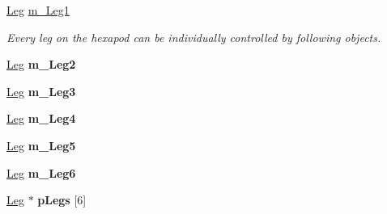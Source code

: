 \textbf{ }\par
\begin{DoxyCompactItemize}
\item 
\mbox{\label{class_movement_controller_a13bd6406481979df9aa10857a38d3381}} 
\mbox{\hyperlink{class_leg}{Leg}} \mbox{\hyperlink{class_movement_controller_a13bd6406481979df9aa10857a38d3381}{m\+\_\+\+Leg1}}
\begin{DoxyCompactList}\small\item\em Every leg on the hexapod can be individually controlled by following objects. \end{DoxyCompactList}\item 
\mbox{\label{class_movement_controller_a98baf7599b6b5c5a4dc852301dc19268}} 
\mbox{\hyperlink{class_leg}{Leg}} {\bfseries m\+\_\+\+Leg2}
\item 
\mbox{\label{class_movement_controller_a0d4edfeb6b4c2ad57dd3b1e387bc4de9}} 
\mbox{\hyperlink{class_leg}{Leg}} {\bfseries m\+\_\+\+Leg3}
\item 
\mbox{\label{class_movement_controller_a8f776e74969ff7983f6cc6909e1dec27}} 
\mbox{\hyperlink{class_leg}{Leg}} {\bfseries m\+\_\+\+Leg4}
\item 
\mbox{\label{class_movement_controller_aa72587ce1fb41820aa9a8f3b94496e69}} 
\mbox{\hyperlink{class_leg}{Leg}} {\bfseries m\+\_\+\+Leg5}
\item 
\mbox{\label{class_movement_controller_a7844bc42dba768e27bb5eb86bea99ef6}} 
\mbox{\hyperlink{class_leg}{Leg}} {\bfseries m\+\_\+\+Leg6}
\item 
\mbox{\label{class_movement_controller_a256c516f976d788154a0bf2420f1d363}} 
\mbox{\hyperlink{class_leg}{Leg}} $\ast$ {\bfseries p\+Legs} \mbox{[}6\mbox{]}
\end{DoxyCompactItemize}



